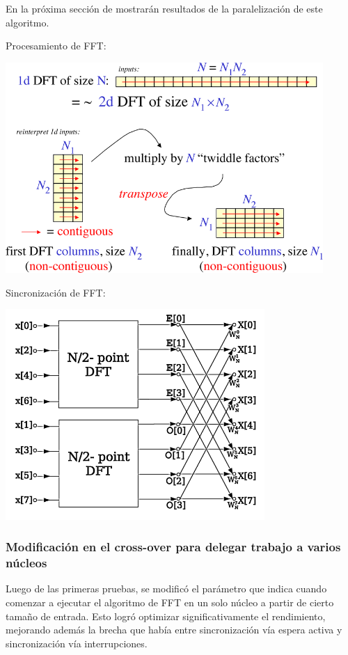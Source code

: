 En la próxima sección de mostrarán resultados de la paralelización de este algoritmo.

\vspace{1cm}
Procesamiento de FFT:
\begin{center}
    \includegraphics[height=8cm]{images/Cooley-tukey-general.png}
\end{center}

\vspace{1cm}
Sincronización de FFT:
\begin{center}
    \includegraphics[height=8cm]{images/DIT-FFT-butterfly.png}
\end{center}

\subsubsection{Modificación en el cross-over para delegar trabajo a varios núcleos}
	Luego de las primeras pruebas, se modificó el parámetro que indica cuando comenzar a ejecutar el algoritmo de FFT en un solo núcleo a partir de cierto tamaño de entrada.
	Esto logró optimizar significativamente el rendimiento, mejorando además la brecha que había entre sincronización vía espera activa y sincronización vía interrupciones.